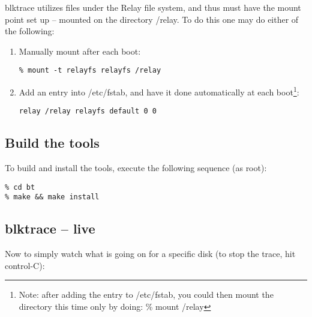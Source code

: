 \documentclass{article}
\begin{document}
blktrace utilizes files under the Relay file system, and thus must have
the mount point set up -- mounted on the directory /relay. To do this
one may do either of the following:

\begin{enumerate}
  \item Manually mount after each boot:
\begin{verbatim}
% mount -t relayfs relayfs /relay
\end{verbatim}

  \item Add an entry into /etc/fstab, and have it done automatically at
  each boot\footnote{Note: after adding the entry to /etc/fstab, you
  could then mount the directory this time only by doing: \% mount /relay}:
\begin{verbatim}
relay /relay relayfs default 0 0
\end{verbatim}
\end{enumerate}

\subsection{\label{sec:build}Build the tools}

To build and install the tools, execute the following sequence (as root):

\begin{verbatim}
% cd bt
% make && make install
\end{verbatim}

\subsection{\label{sec:live-blktrace}blktrace -- live}

Now to simply watch what is going on for a specific disk (to stop the
trace, hit control-C):
\end{document}
